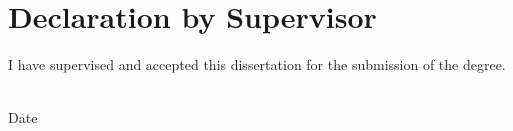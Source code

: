 \chapter*{Declaration by Supervisor}

\begin{flushleft}
	I have supervised and accepted this dissertation for the submission of the degree. \\

	\vspace{15mm}
	
	{\makebox[6.5cm]{\dotfill}} \hfill {\makebox[5cm]{\dotfill}}  \\ 
	\supervisorA \hfill Date \\
	
	
	
\end{flushleft}
